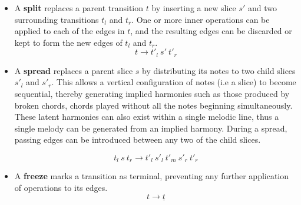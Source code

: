 \documentclass[12pt,a4paper,twoside,openany]{report} \usepackage[pdfborder={0 0 0}]{hyperref}    %
\theoremstyle{definition} \newtheorem{definition}{Definition}[section]
\begin{document}
    \begin{itemize} \item A \textbf{split} replaces a parent transition $t$ by inserting a new slice $s'$ and two
      surrounding transitions $t_l$ and $t_r$. One or more inner operations can be applied to each of the edges in
      $t$, and the resulting edges can be discarded or kept to form the new edges of $t_l$ and $t_r$. 
      \begin{equation} t \to t'_l~s'~t'_r \label{eq:splitrule} \end{equation} 
      \item A \textbf{spread}
      replaces a parent slice $s$ by distributing its notes to two child slices $s'_l$ and $s'_r$. 
      This allows a vertical configuration of notes (i.e a slice) to become sequential, thereby generating implied
      harmonies such as those produced by broken chords, chords played without all the notes beginning simultaneously. These latent harmonies can also exist within a single melodic
      line, thus a single melody can be generated from an implied harmony. During a spread, passing edges can be
      introduced between any two of the child slices. 

      \begin{equation} t_l~s~t_r \to t'_l~s'_l~t'_m~s'_r~t'_r \label{eq:spreadrule} \end{equation} 
      \item A \textbf{freeze} marks a transition as terminal, preventing any further application of operations to its edges. 
  \begin{equation} t \to \underline{t} \label{eq:freezerule} \end{equation} 
\end{itemize}


\end{document}
